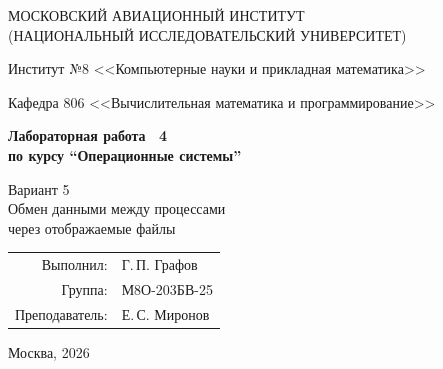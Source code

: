 \begin{titlepage}
\begin{center}
\large
МОСКОВСКИЙ АВИАЦИОННЫЙ ИНСТИТУТ\\
(НАЦИОНАЛЬНЫЙ ИССЛЕДОВАТЕЛЬСКИЙ УНИВЕРСИТЕТ)

\vspace{20pt}
Институт №8 <<Компьютерные науки и прикладная математика>>

Кафедра 806 <<Вычислительная математика и программирование>>
\end{center}

\vspace{60pt}
\begin{center}
\bfseries\large
Лабораторная работа \textnumero\ 4\\
по курсу \enquote{Операционные системы}

\vspace{30pt}
Вариант 5\\
Обмен данными между процессами\\
через отображаемые файлы
\end{center}

\vfill
\begin{flushright}
\large
\begin{tabular}{rl}
Выполнил: & Г.\,П. Графов \\
Группа: & М8О-203БВ-25 \\
Преподаватель: & Е.\,С. Миронов \\
\end{tabular}
\end{flushright}

\vspace{70pt}
\begin{center}
\large Москва, 2026
\end{center}
\end{titlepage}
\clearpage

